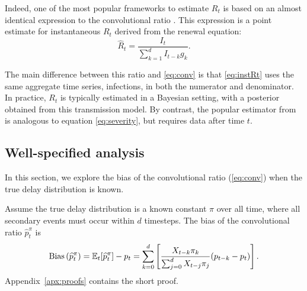 \documentclass{article}
\renewcommand{\hat}{\widehat} %
\DeclareMathOperator{\bias}{Bias}
\newcommand{\djmcomment}[1]{{\color{teal}[DJM: #1]}}
\newcommand{\jmgcomment}[1]{{\color{cyan}[JMG: #1]}}
\begin{document}
Indeed, one of the most popular frameworks to estimate $R_t$ is based on an almost identical expression to the convolutional ratio \citep{fraser2007,wallinga2007how,cori2013new,rtestim}. This expression is a point estimate for instantaneous $R_t$ derived from the renewal equation:
\begin{equation}\label{eq:instRt}
    \hat{R}_t = \frac{I_t}{\sum_{k=1}^d I_{t-k}g_k}.
\end{equation}

The main difference between this ratio and \eqref{eq:conv} is that \eqref{eq:instRt} uses the same aggregate time series, infections, in both the numerator and denominator. In practice, $R_t$ is typically estimated in a Bayesian setting, with a posterior obtained from this transmission model. By contrast, the popular estimator from \citet{wallinga_teunis} is analogous to equation \eqref{eq:severity}, but requires data after time $t$.

\subsection{Well-specified analysis}\label{sec:ws_analysis}

In this section, we explore the bias of the convolutional ratio (\ref{eq:conv}) when the true delay distribution is known.

\begin{proposition}\label{thm:OracleBias}
    Assume the true delay distribution is a known constant $\pi$ over all time, where all secondary events must occur within $d$ timesteps. 
    The bias of the convolutional ratio $\hat{p}_t^\pi$ is
\begin{equation*}
    \bias\left(\hat{p}_t^\pi\right) = \E_t[\hat{p}_t^\pi] - p_t = \sum_{k=0}^d \left[ \frac{X_{t-k}\pi_k}{\sum_{j=0}^d X_{t-j}\pi_j} (p_{t-k}-p_t) \right].
\end{equation*}
Appendix~\ref{apx:proofs} contains the short proof.
\end{proposition}
\end{document}
